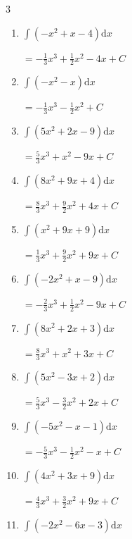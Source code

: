 \begin{multicols}{3}
\begin{enumerate}
  \item $\displaystyle \int \left( -x^{2}+x-4 \right) \mathrm{d}x$

        $\displaystyle =-\frac{1}{3}x^{3}+\frac{1}{2}x^{2}-4x+ C$

\columnbreak %

  \item $\displaystyle \int \left( -x^{2}-x \right) \mathrm{d}x$

        $\displaystyle =-\frac{1}{3}x^{3}-\frac{1}{2}x^{2}+ C$

  \item $\displaystyle \int \left( 5x^{2}+2x-9 \right) \mathrm{d}x$

        $\displaystyle =\frac{5}{3}x^{3}+x^{2}-9x+ C$

  \item $\displaystyle \int \left( 8x^{2}+9x+4 \right) \mathrm{d}x$

        $\displaystyle =\frac{8}{3}x^{3}+\frac{9}{2}x^{2}+4x+ C$

  \item $\displaystyle \int \left( x^{2}+9x+9 \right) \mathrm{d}x$

        $\displaystyle =\frac{1}{3}x^{3}+\frac{9}{2}x^{2}+9x+ C$

  \item $\displaystyle \int \left( -2x^{2}+x-9 \right) \mathrm{d}x$

        $\displaystyle =-\frac{2}{3}x^{3}+\frac{1}{2}x^{2}-9x+ C$

  \item $\displaystyle \int \left( 8x^{2}+2x+3 \right) \mathrm{d}x$

        $\displaystyle =\frac{8}{3}x^{3}+x^{2}+3x+ C$

  \item $\displaystyle \int \left( 5x^{2}-3x+2 \right) \mathrm{d}x$

        $\displaystyle =\frac{5}{3}x^{3}-\frac{3}{2}x^{2}+2x+ C$

  \item $\displaystyle \int \left( -5x^{2}-x-1 \right) \mathrm{d}x$

        $\displaystyle =-\frac{5}{3}x^{3}-\frac{1}{2}x^{2}-x+ C$

  \item $\displaystyle \int \left( 4x^{2}+3x+9 \right) \mathrm{d}x$

        $\displaystyle =\frac{4}{3}x^{3}+\frac{3}{2}x^{2}+9x+ C$

  \item $\displaystyle \int \left( -2x^{2}-6x-3 \right) \mathrm{d}x$


\end{enumerate}
\end{multicols}

